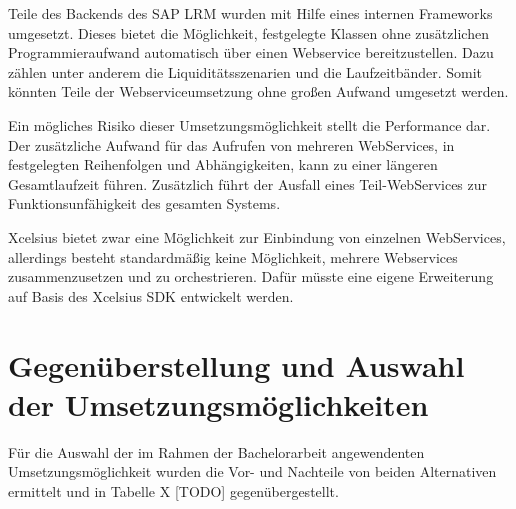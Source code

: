 Teile des Backends des SAP LRM wurden mit Hilfe eines internen Frameworks umgesetzt. Dieses bietet die Möglichkeit, festgelegte Klassen ohne zusätzlichen Programmieraufwand automatisch über einen Webservice bereitzustellen. Dazu zählen unter anderem die Liquiditätsszenarien und die Laufzeitbänder. Somit könnten Teile der Webserviceumsetzung ohne großen Aufwand umgesetzt werden.

Ein mögliches Risiko dieser Umsetzungsmöglichkeit stellt die Performance dar. Der zusätzliche Aufwand für das Aufrufen von mehreren WebServices, in festgelegten Reihenfolgen und Abhängigkeiten, kann zu einer längeren Gesamtlaufzeit führen. Zusätzlich führt der Ausfall eines Teil-WebServices zur Funktionsunfähigkeit des gesamten Systems.

Xcelsius bietet zwar eine Möglichkeit zur Einbindung von einzelnen WebServices, allerdings besteht standardmäßig keine Möglichkeit, mehrere Webservices zusammenzusetzen und zu orchestrieren. Dafür müsste eine eigene Erweiterung auf Basis des Xcelsius SDK entwickelt werden.

\section{Gegenüberstellung und Auswahl der Umsetzungsmöglichkeiten}

Für die Auswahl der im Rahmen der Bachelorarbeit angewendenten Umsetzungsmöglichkeit wurden die Vor- und Nachteile von beiden Alternativen ermittelt und in Tabelle X [TODO] gegenübergestellt.

